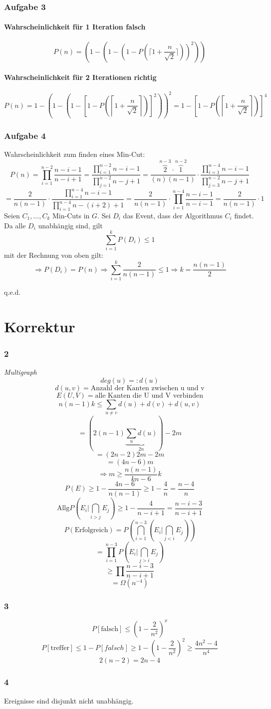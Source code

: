 \documentclass[a4paper,11pt,twoside]{scrartcl}
\newcommand{\qed}{%
	\begin{flushright}
		q.e.d.
	\end{flushright}%
	}
\begin{document}
\section{Aufgabe 3}
\subsection{Wahrscheinlichkeit für 1 Iteration falsch}
\[ P(n) = \left( 1-\left( 1- \left( 1- P\left(\lceil1+\frac{n}{\sqrt{2}} \rceil\right) \right)^2 \right) \right)\]
\subsection{Wahrscheinlichkeit für 2 Iterationen richtig}

\[ P(n) = 1- \left( 1-\left( 1- \left[ 1- P\left(\left\lceil1+\frac{n}{\sqrt{2}} \right\rceil\right) \right]^2 \right) \right)^2 = 1-\left[ 1- P\left(\left\lceil1+\frac{n}{\sqrt{2}} \right\rceil\right) \right]^4
\]
\section{Aufgabe 4}
Wahrscheinlichkeit zum finden eines Min-Cut:
\[ P(n) = \prod_{i=1}^{n-2} \frac{n-i-1}{n-i+1} = \frac{\prod_{i=1}^{n-2} n-i-1}{\prod_{j=1}^{n-2}n - j + 1} = \frac{\overset{n-3}{\overbrace{2}} \cdot \overset{n-2}{\overbrace{1}}}{(n)(n-1)} \cdot \frac{\prod_{i = 1}^{n-4} n - i - 1}{\prod_{j = 3}^{n - 2} n - j + 1}\]
\[ = \frac{2}{n(n-1)} \cdot \frac{\prod_{i = 1}^{n-4} n - i - 1}{\prod_{i = 1}^{n - 4} n - (i + 2) + 1}= \frac{2}{n(n-1)} \cdot \prod_{i = 1}^{n-4}\frac{ n - i - 1}{ n - i - 1} = \frac{2}{n(n-1)}\cdot 1 \]
Seien $C_1,\ldots,C_k$ Min-Cuts in $G$. Sei $D_i$ das Event, dass der Algorithmus $C_i$ findet. Da alle  $D_i$ unabhängig sind, gilt
\[ \sum_{i=1}^{k}P(D_i) \leq 1 \]
mit der Rechnung von oben gilt:
\[ \Rightarrow P(D_i) = P(n) \Rightarrow \sum_{i=1}^{k} \frac{2}{n(n-1)} \leq 1 \Rightarrow k = \frac{n(n-1)}{2} \]
\qed
\pagebreak
\part{Korrektur}
\section{2}
\emph{Multigraph}
\[ deg(u) =: d(u) \]
\[ d(u,v) = \text{Anzahl der Kanten zwischen u und v} \]
\[ E(U,V) = \text{alle Kanten die U und V verbinden} \]
\[ n(n-1)k \leq \sum_{u\neq v} d(u)+d(v) + d(u,v)\]
\[ = (2(n-1)\underset{2n}{\underbrace{\sum_{u} d(u)}}) - 2m \]
\[ = (2n -2)2m - 2m \]
\[ = (4n - 6)m \]
\[ \Rightarrow m \geq \frac{n(n-1)}{kn-6}k \]
\[ P(E) \geq 1 - \frac{4n - 6}{n(n-1)} \geq 1 -\frac{4}{n} = \frac{n - 4}{n} \]
\[ \text{Allg} P(E_i | \bigcap_{i > j} E_j) \geq 1 - \frac{4}{n-i+1} = \frac{n - i - 3}{n - i + 1} \]
\[ P(\text{Erfolgreich}) = P(\bigcap_{i=1}^{n-3} (E_i | \bigcap_{j<i}E_j)) \]
\[ =\prod_{i=1}^{n-3}P(E_i|\bigcap_{j>i}E_j) \]
\[ \geq \prod \frac{n - i - 3}{n - i + 1} \]
\[ = \Omega(n^{-4}) \]
\section{3}
\[ P[\text{falsch}] \leq \left( 1 - \frac{2}{n^2} \right)^x \]
\[ P[\text{treffer}] \leq 1 - P[falsch] \geq 1 - (1 - \frac{2}{n^2})^2 \geq \frac{4n^2 - 4}{n^4}  \]
\[ 2(n-2) = 2n - 4 \]
\section{4}
Ereignisse sind disjunkt nicht unabhängig.
\end{document}
